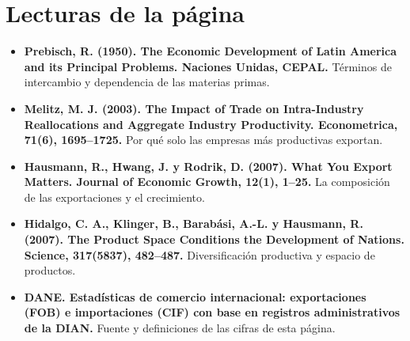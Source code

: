 \section*{Lecturas de la página}
\begin{itemize}\small
\item \textbf{Prebisch, R. (1950). The Economic Development of Latin America and its Principal Problems. Naciones Unidas, CEPAL.} Términos de intercambio y dependencia de las materias primas.
\item \textbf{Melitz, M. J. (2003). The Impact of Trade on Intra-Industry Reallocations and Aggregate Industry Productivity. Econometrica, 71(6), 1695–1725.} Por qué solo las empresas más productivas exportan.
\item \textbf{Hausmann, R., Hwang, J. y Rodrik, D. (2007). What You Export Matters. Journal of Economic Growth, 12(1), 1–25.} La composición de las exportaciones y el crecimiento.
\item \textbf{Hidalgo, C. A., Klinger, B., Barabási, A.-L. y Hausmann, R. (2007). The Product Space Conditions the Development of Nations. Science, 317(5837), 482–487.} Diversificación productiva y espacio de productos.
\item \textbf{DANE. Estadísticas de comercio internacional: exportaciones (FOB) e importaciones (CIF) con base en registros administrativos de la DIAN.} Fuente y definiciones de las cifras de esta página.
\end{itemize}
